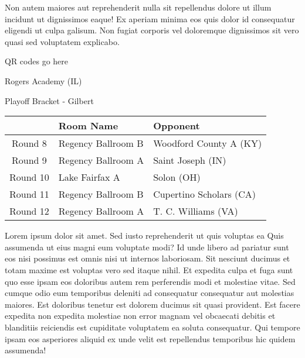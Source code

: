 \documentclass{article}%
\begin{document}
\newline%
Non autem maiores aut reprehenderit nulla sit repellendus dolore ut illum incidunt ut dignissimos eaque! Ex aperiam minima eos quis dolor id consequatur eligendi ut culpa galisum. Non fugiat corporis vel doloremque dignissimos sit vero quasi sed voluptatem explicabo.\newline%
\newline%
%
\vspace*{30pt}%
\begin{center}%
\begin{Huge}%
QR codes go here%
\end{Huge}%
\end{center}%
\newpage%
\begin{center}%
\begin{Huge}%
Rogers Academy (IL)%
\end{Huge}%
\vspace*{8pt}%
\linebreak%
\begin{Large}%
Playoff Bracket {-} Gilbert%
\end{Large}%
\end{center}%
\begin{tabularx}{\textwidth}{|c|Y|Y|}%
\hline%
&Room Name&Opponent\\%
\hline%
Round 8&Regency Ballroom B&Woodford County A (KY)\\%
Round 9&Regency Ballroom A&Saint Joseph (IN)\\%
Round 10&Lake Fairfax A&Solon (OH)\\%
Round 11&Regency Ballroom B&Cupertino Scholars (CA)\\%
Round 12&Regency Ballroom A&T. C. Williams (VA)\\%
\hline%
\end{tabularx}%
\vspace*{8pt}%
\linebreak%
\newline%
\newline%
Lorem ipsum dolor sit amet. Sed iusto reprehenderit ut quis voluptas ea Quis assumenda ut eius magni eum voluptate modi? Id unde libero ad pariatur sunt eos nisi possimus est omnis nisi ut internos laboriosam. Sit nesciunt ducimus et totam maxime est voluptas vero sed itaque nihil. Et expedita culpa et fuga sunt quo esse ipsam eos doloribus autem rem perferendis modi et molestiae vitae.\newline%
\newline%
Sed cumque odio eum temporibus deleniti ad consequatur consequatur aut molestias maiores. Est doloribus tenetur est dolorem ducimus sit quasi provident. Est facere expedita non expedita molestiae non error magnam vel obcaecati debitis et blanditiis reiciendis est cupiditate voluptatem ea soluta consequatur. Qui tempore ipsam eos asperiores aliquid ex unde velit est repellendus temporibus hic quidem assumenda!\newline%
\end{document}
